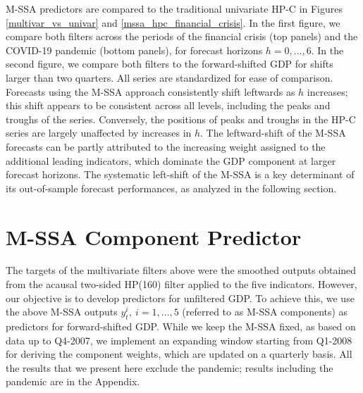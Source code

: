 \documentclass[11pt,a4paper]{article}
\begin{document}
M-SSA predictors are compared to the traditional univariate HP-C in Figures  \ref{multivar_vs_univar} and \ref{mssa_hpc_financial_crisis}. In the first figure, we compare both filters across the periods of the financial crisis (top panels) and the COVID-19 pandemic (bottom panels), for forecast horizons $h=0,...,6$. 
In the second figure, we compare both filters to the forward-shifted GDP for shifts larger than two quarters. All series are standardized for ease of comparison. Forecasts using the M-SSA approach consistently shift leftwards as $h$ increases; this shift appears to be consistent across all levels, including the peaks and troughs of the series. Conversely, the positions of peaks and troughs in the HP-C series are largely unaffected by increases in $h$. The leftward-shift of  the M-SSA forecasts can be partly attributed to the increasing weight assigned to the additional leading indicators, which dominate the GDP component at larger forecast horizons. %
The systematic left-shift of the M-SSA is a key determinant of its out-of-sample forecast performances, as analyzed in the following section. 


\section{M-SSA Component Predictor}\label{sec:mSSA_component}

The targets of the multivariate filters above were the smoothed outputs obtained from the acausal two-sided HP(160) filter applied to the five indicators. However, our objective is to develop predictors for unfiltered GDP. To achieve this, we use the above M-SSA outputs $y_t^i, \: i = 1, \ldots, 5$ (referred to as M-SSA components) as predictors for forward-shifted GDP.
While we keep the M-SSA fixed, as based on data up to Q4-2007, we implement an expanding window starting from Q1-2008 for deriving the component weights, which are updated on a quarterly basis. 
All the results that we present here exclude the pandemic; results including the pandemic are in the Appendix.\\


\end{document}
